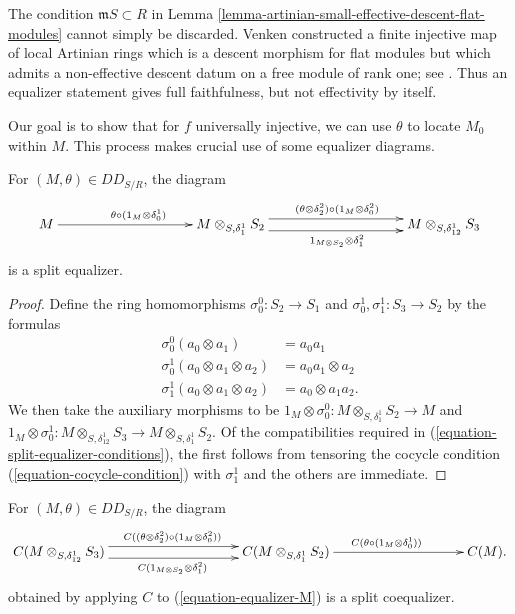 \begin{remark}
\label{remark-finite-artinian-flat-descent-counterexample}
The condition $\mathfrak mS \subset R$ in
Lemma \ref{lemma-artinian-small-effective-descent-flat-modules} cannot simply
be discarded. Venken constructed a finite injective map of local Artinian
rings which is a descent morphism for flat modules but which admits a
non-effective descent datum on a free module of rank one; see \cite{Venken}.
Thus an equalizer statement gives full faithfulness, but not effectivity by
itself.
\end{remark}

\noindent
Our goal is to show that for $f$ universally injective, we can use $\theta$ to 
locate $M_0$ within $M$. This process makes crucial use of some equalizer
diagrams.

\begin{lemma}
\label{lemma-equalizer-M}
For $(M,\theta) \in DD_{S/R}$, the diagram
\begin{equation}
\label{equation-equalizer-M}
\xymatrix@C=8pc{
M \ar[r]^{\theta \circ (1_M \otimes \delta_0^1)} &
M \otimes_{S, \delta_1^1} S_2
\ar@<1ex>[r]^{(\theta \otimes \delta_2^2) \circ (1_M \otimes \delta^2_0)}
\ar@<-1ex>[r]_{1_{M \otimes S_2} \otimes \delta^2_1} & 
M \otimes_{S, \delta_{12}^1} S_3
}
\end{equation}
is a split equalizer.
\end{lemma}

\begin{proof}
Define the ring homomorphisms $\sigma^0_0: S_2 \to S_1$ and $\sigma_0^1, 
\sigma_1^1: S_3 \to S_2$ by the formulas
\begin{align*}
\sigma^0_0 (a_0 \otimes a_1) & = a_0a_1 \\
\sigma^1_0 (a_0 \otimes a_1 \otimes a_2) & = a_0a_1 \otimes a_2 \\
\sigma^1_1 (a_0 \otimes a_1 \otimes a_2) & = a_0 \otimes a_1a_2.
\end{align*}
We then take the auxiliary morphisms to be 
$1_M \otimes \sigma_0^0: M \otimes_{S, \delta_1^1} S_2 \to M$
and $1_M \otimes \sigma_0^1: M \otimes_{S,\delta_{12}^1} S_3 \to M \otimes_{S, 
\delta_1^1} S_2$.
Of the compatibilities required in (\ref{equation-split-equalizer-conditions}), 
the first follows from tensoring the cocycle condition
(\ref{equation-cocycle-condition}) with $\sigma_1^1$
and the others are immediate.
\end{proof}

\begin{lemma}
\label{lemma-equalizer-CM}
For $(M, \theta) \in DD_{S/R}$, the diagram
\begin{equation}
\label{equation-coequalizer-CM}
\xymatrix@C=8pc{
C(M \otimes_{S, \delta_{12}^1} S_3)
\ar@<1ex>[r]^{C((\theta \otimes \delta_2^2) \circ (1_M \otimes \delta^2_0))}
\ar@<-1ex>[r]_{C(1_{M \otimes S_2} \otimes \delta^2_1)} &
C(M \otimes_{S, \delta_1^1} S_2 )
\ar[r]^{C(\theta \circ (1_M \otimes \delta_0^1))} & C(M).
}
\end{equation}
obtained by applying $C$ to (\ref{equation-equalizer-M}) is a split
coequalizer.
\end{lemma}


